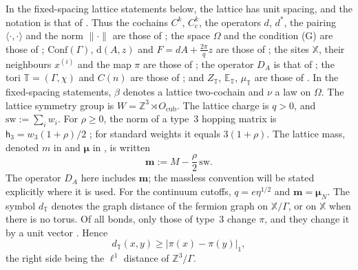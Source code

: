 \documentclass[11pt,letterpaper,reqno]{amsart}
\theoremstyle{definition}
\begin{document}
In the fixed-spacing lattice statements below, the lattice has unit spacing, and the notation is that of \cite[Section~2]{QEDII}.
Thus the cochains $C^k$, $C^k_{\mathrm c}$, the operators $d$, $d^{*}$, the pairing $\langle\cdot,\cdot\rangle$ and the norm $\|\cdot\|$ are those of \cite[Definition~2.1]{QEDII};
the space $\Omega$ and the condition (G) are those of \cite[Definition~2.5]{QEDII};
$\mathrm{Conf}(\Gamma)$, $\mathrm d(A,z)$ and $F=dA+\frac{2\pi}{q}z$ are those of \cite[Definition~2.6]{QEDII};
the sites $\mathbb X$, their neighbours $x^{(i)}$ and the map $\pi$ are those of \cite[Definition~2.4]{QEDII};
the operator $D_A$ is that of \cite[Definition~2.10]{QEDII};
the tori $\mathbb T=(\Gamma,\chi)$ and $C(n)$ are those of \cite[Definition~2.11]{QEDII};
and $Z_{\mathbb T}$, $\mathbb E_{\mathbb T}$, $\mu_{\mathbb T}$ are those of \cite[Definition~2.13]{QEDII}.
In the fixed-spacing statements, $\beta$ denotes a lattice two-cochain and $\nu$ a law on $\Omega$.
The lattice symmetry group is $W=\mathbb Z^3\rtimes O_{\mathrm{cub}}$.
The lattice charge is $q>0$, and $\mathrm{sw}:=\sum_iw_i$.
For $\rho\ge0$, the norm of a type~3 hopping matrix is
$\mathsf h_3=w_3(1+\rho)/2$ \cite[Lemma~3.8(a)]{QEDII};
for standard weights it equals $3(1+\rho)$.
The lattice mass, denoted $m$ in \cite[Definition~2.10]{QEDII} and $\boldsymbol\mu$ in \cite[(I.2.5)]{QEDIII}, is written
\begin{equation*}
\mathbf m:=M-\frac{\rho}{2}\,\mathrm{sw}.
\end{equation*}
The operator $D_A$ here includes $\mathbf m$; the massless convention
will be stated explicitly where it is used. For the continuum cutoffs,
$q=e\eta^{1/2}$ and $\mathbf m=\boldsymbol\mu_N$.
The symbol $d_{\mathbb T}$ denotes the graph distance of the fermion graph on $\mathbb X/\Gamma$, or on $\mathbb X$ when there is no torus.
Of all bonds, only those of type~$3$ change $\pi$, and they change it by a unit vector \cite[Proposition~3.6\,(c)]{QEDII}.
Hence
\begin{equation*}
d_{\mathbb T}(x,y)\ge|\pi(x)-\pi(y)|_1,
\end{equation*}
the right side being the $\ell^1$ distance of $\mathbb Z^3/\Gamma$.
\end{document}
